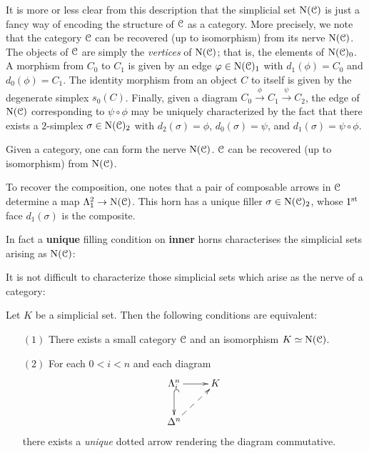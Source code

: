 \begin{1.1.2 inf-Categories}
It is more or less clear from this description that the simplicial
set $\operatorname{N}(\operatorname{\mathcal{C}})$ is just a fancy way of encoding the structure
of $\operatorname{\mathcal{C}}$ as a category. More precisely, we note that the
category $\operatorname{\mathcal{C}}$ can be recovered (up to isomorphism) from its
nerve $\operatorname{N}(\operatorname{\mathcal{C}})$. The objects of $\operatorname{\mathcal{C}}$ are simply the {\it
vertices} of $\operatorname{N}(\operatorname{\mathcal{C}})$; that is, the elements of $\operatorname{N}
(\operatorname{\mathcal{C}})_0$. A morphism from $C_0$ to $C_1$ is given by an edge $\varphi
\in \operatorname{N}(\operatorname{\mathcal{C}})_1$ with $d_1(\phi) = C_0$ and $d_0(\phi)=C_1$. The
identity morphism from an object $C$ to itself is given by the
degenerate simplex $s_0(C)$. Finally, given a diagram $C_0
\stackrel{\phi}{\rightarrow} C_1 \stackrel{\psi}{\rightarrow}
C_2$, the edge of $\operatorname{N}(\operatorname{\mathcal{C}})$ corresponding to $\psi \circ
\phi$ may be uniquely characterized by the fact that there exists
a $2$-simplex $\sigma \in \operatorname{N}(\operatorname{\mathcal{C}})_2$ with $d_2(\sigma)=\phi$,
$d_0(\sigma)=\psi$, and $d_1(\sigma)=\psi \circ \phi$.
\begin{shaded}
Given a category, one can form the nerve $\operatorname{N}(\operatorname{\mathcal{C}})$. $\operatorname{\mathcal{C}}$ can be recovered (up to isomorphism) from $\operatorname{N}(\operatorname{\mathcal{C}})$.

To recover the composition, one notes that a pair of composable arrows in $\operatorname{\mathcal{C}}$ determine a map $\Lambda^2_1\rightarrow\operatorname{N}(\operatorname{\mathcal{C}})$. This horn has a unique filler $\sigma\in \operatorname{N}(\operatorname{\mathcal{C}})_2$, whose $1^\textup{st}$ face $d_1(\sigma)$ is the composite.

In fact a \textbf{unique} filling condition on \textbf{inner} horns characterises the simplicial sets arising as $\operatorname{N}(\operatorname{\mathcal{C}})$:
\end{shaded}

It is not difficult to characterize those simplicial sets which arise as the nerve of a category:
\begin{proposition}\label{ruko}
Let $K$ be a simplicial set. Then the following conditions are equivalent:
\begin{itemize}
\item[$(1)$] There exists a small category $\operatorname{\mathcal{C}}$ and an isomorphism $K \simeq \operatorname{N}(\operatorname{\mathcal{C}})$.
\item[$(2)$] For each $0 < i < n$ and each diagram
$$ \xymatrix{ \Lambda^n_i \ar@{^{(}->}[d] \ar[r] & K \\
\Delta^n \ar@{-->}[ur], & \\}$$
there exists a {\em unique} dotted arrow rendering the diagram commutative.
\end{itemize}
\end{proposition}


\end{1.1.2 inf-Categories}
